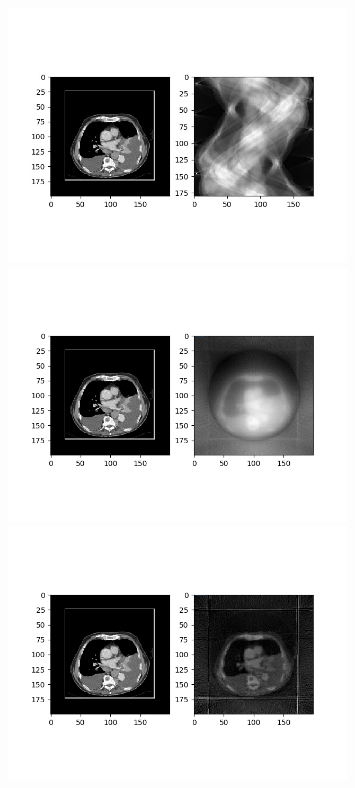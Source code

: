 \documentclass{article}
\begin{document}
\begin{figure}
\begin{center}
\includegraphics[width=0.8\textwidth]{./something/sinogram.jpg}
\includegraphics[width=0.8\textwidth]{./something/reconstructedImg.png}
\includegraphics[width=0.8\textwidth]{./something/reconstructedImg2.png}
\end{center}
\end{figure}
\end{document}
